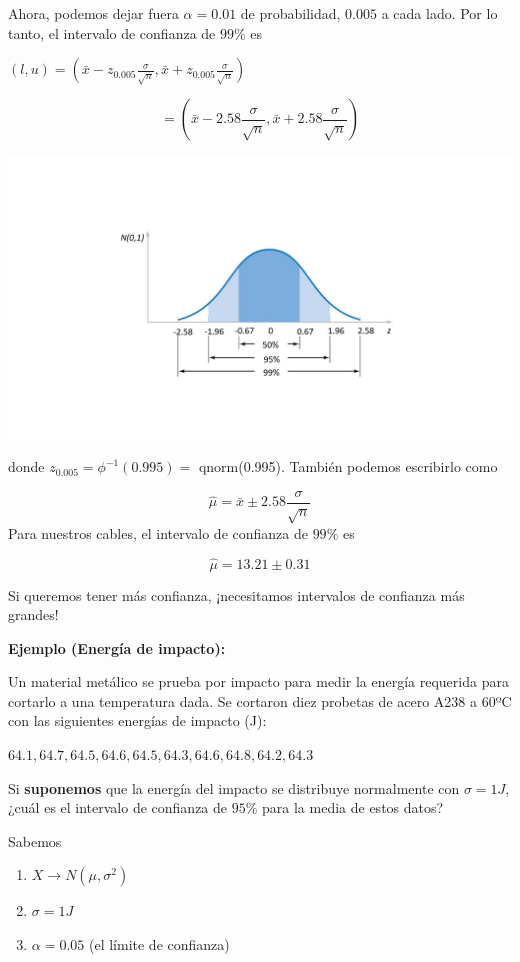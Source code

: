 \documentclass[
]{book}
\providecommand{\tightlist}{%
  \setlength{\itemsep}{0pt}\setlength{\parskip}{0pt}}
\begin{document}
Ahora, podemos dejar fuera \(\alpha=0.01\) de probabilidad, \(0.005\) a cada lado. Por lo tanto, el intervalo de confianza de \(99\%\) es

\((l,u) = (\bar{x} - z_{0.005}\frac{\sigma}{\sqrt{n}},\bar{x} + z_{0.005}\frac{\sigma}{\sqrt{n}})\)

\[= (\bar{x} - 2.58\frac{\sigma}{\sqrt{n}},\bar{x} + 2.58\frac{\sigma}{\sqrt{n}})\]

\includegraphics{./figures/phi.JPG}

donde \(z_{0.005}=\phi^{-1}(0.995)=\) qnorm(0.995). También podemos escribirlo como

\[\hat{\mu}=\bar{x} \pm 2.58\frac{\sigma}{\sqrt{n}}\]
Para nuestros cables, el intervalo de confianza de \(99\%\) es

\[\hat{\mu}= 13.21 \pm 0.31\]

Si queremos tener más confianza, ¡necesitamos intervalos de confianza más grandes!

\textbf{Ejemplo (Energía de impacto):}

Un material metálico se prueba por impacto para medir la energía requerida para cortarlo a una temperatura dada. Se cortaron diez probetas de acero A238 a 60ºC con las siguientes energías de impacto (J):

\(64.1, 64.7, 64.5, 64.6, 64.5, 64.3, 64.6, 64.8, 64.2, 64.3\)

Si \textbf{suponemos} que la energía del impacto se distribuye normalmente con \(\sigma=1J\), ¿cuál es el intervalo de confianza de \(95\%\) para la media de estos datos?

Sabemos

\begin{enumerate}
\def\labelenumi{\arabic{enumi}.}
\tightlist
\item
  \(X \rightarrow N(\mu, \sigma^2)\)
\item
  \(\sigma=1J\)
\item
  \(\alpha=0.05\) (el límite de confianza)
\end{enumerate}
\end{document}
